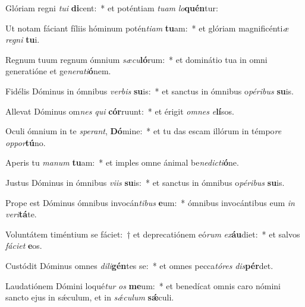 \item Glóriam regni \textit{tu}\textit{i} \textbf{di}cent:~* et poténtiam \textit{tu}\textit{am} \textit{lo}\textbf{quén}tur:
\item Ut notam fáciant fíliis hóminum potén\textit{ti}\textit{am} \textbf{tu}am:~* et glóriam magnificénti\textit{æ} \textit{re}\textit{gni} \textbf{tu}i.
\item Regnum tuum regnum ómnium \textit{sæ}\textit{cu}\textbf{ló}rum:~* et dominátio tua in omni generatióne et ge\textit{ne}\textit{ra}\textit{ti}\textbf{ó}nem.
\item Fidélis Dóminus in ómnibus \textit{ver}\textit{bis} \textbf{su}is:~* et sanctus in ómnibus o\textit{pé}\textit{ri}\textit{bus} \textbf{su}is.
\item Allevat Dóminus om\textit{nes} \textit{qui} \textbf{cór}ruunt:~* et érigit \textit{om}\textit{nes} \textit{e}\textbf{lí}sos.
\item Oculi ómnium in te \textit{spe}\textit{rant}, \textbf{Dó}mine:~* et tu das escam illórum in témpo\textit{re} \textit{op}\textit{por}\textbf{tú}no.
\item Aperis tu \textit{ma}\textit{num} \textbf{tu}am:~* et imples omne ánimal be\textit{ne}\textit{dic}\textit{ti}\textbf{ó}ne.
\item Justus Dóminus in ómnibus \textit{vi}\textit{is} \textbf{su}is:~* et sanctus in ómnibus o\textit{pé}\textit{ri}\textit{bus} \textbf{su}is.
\item Prope est Dóminus ómnibus invocán\textit{ti}\textit{bus} \textbf{e}um:~* ómnibus invocántibus eum \textit{in} \textit{ve}\textit{ri}\textbf{tá}te.
\item Voluntátem timéntium se fáciet:~† et deprecatiónem eó\textit{rum} \textit{ex}\textbf{áu}diet:~* et salvos \textit{fá}\textit{ci}\textit{et} \textbf{e}os.
\item Custódit Dóminus omnes \textit{di}\textit{li}\textbf{gén}tes se:~* et omnes pecca\textit{tó}\textit{res} \textit{dis}\textbf{pér}det.
\item Laudatiónem Dómini loqué\textit{tur} \textit{os} \textbf{me}um:~* et benedícat omnis caro nómini sancto ejus in sǽculum, et in \textit{sǽ}\textit{cu}\textit{lum} \textbf{sǽ}culi.
